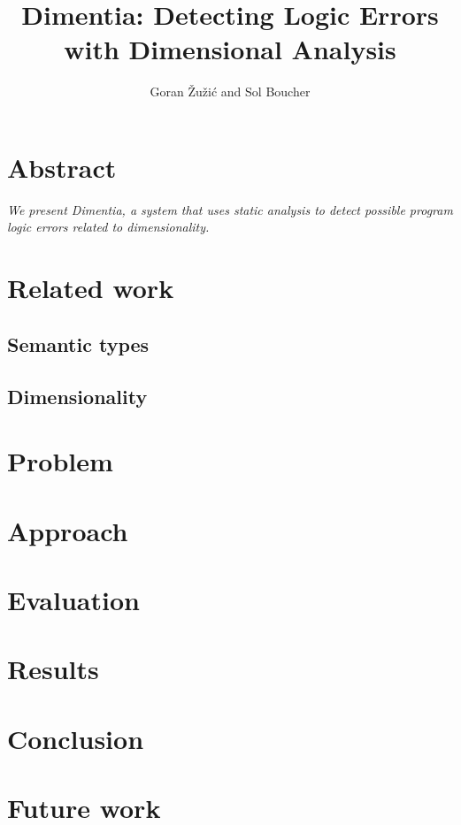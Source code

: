 \documentclass[12pt]{article}
\title{\Large Dimentia: Detecting Logic Errors with Dimensional Analysis}
\author{Goran \v{Z}u\v{z}i\'c and Sol Boucher}
\begin{document}
\maketitle

\section*{Abstract}

\textit{We present \textnormal{Dimentia}, a system that uses static analysis to detect possible program logic errors related to dimensionality.}

\section{Related work}

\subsection{Semantic types}

\subsection{Dimensionality}

\section{Problem}

\section{Approach}

\section{Evaluation}

\section{Results}

\section{Conclusion}

\section{Future work}



\end{document}

